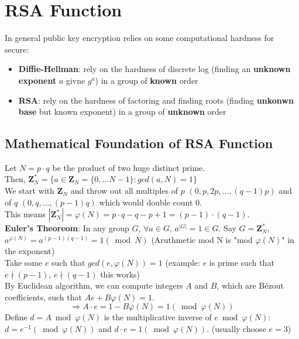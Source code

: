 \documentclass{scribe}
\begin{document}
\maketitle


\section{RSA Function}
In general public key encryption relies on some computational hardness for secure:
\begin{itemize}
    \item \textbf{Diffie-Hellman}: rely on the hardness of discrete log (finding an \textbf{unknown exponent} $a$ givne $g^a$) in a group of \textbf{known} order
    \item \textbf{RSA}: rely on the hardness of factoring and finding roots (finding \textbf{unkonwn base} but known exponent) in a group of \textbf{unknown} order
\end{itemize}

\subsection{Mathematical Foundation of RSA Function}
Let $N = p \cdot q$ be the product of two huge distinct prime.
\\
Then, $\mathbf{Z}_N^* = \{a \in \mathbf{Z}_N = \{0, \dots N-1\}: gcd(a,N) =1\}$
\\
We start with $\mathbf{Z}_N$ and throw out all multiples of $p$ $(0,p,2p, \dots , (q-1)p)$ and of $q$ $(0,q, \dots, (p-1)q)$ which would double count 0. 
\\
This means $|\mathbf{Z}_N^*| = \varphi(N) = p \cdot q - q -p +1 = (p-1)\cdot (q-1)$.
\\
\textbf{Euler's Theoreom}: In any group $G$, $\forall  a \in G$, $a^{|G|} = 1 \in G$. 
Say $G = \mathbf{Z}_N^*$, $a^{\varphi(N)}=a^{(p-1)(q-1)} = 1 (\bmod N)$ 
(Aruthmetic  mod N is "mod $\varphi(N)$" in the exponent)
\\
Take some $e$ such that $gcd(e,\varphi(N)) = 1$ (example: $e$ is prime such that $e \nmid (p-1)$, $e \nmid (q-1)$ this works)
\\
By Euclidean algorithm, we can compute integers $A$ and $B$, which are B\'{e}zout coefficients, such that $Ae+B\varphi(N) = 1$.
\\
\[\Rightarrow A \cdot e = 1 - B \varphi(N) = 1 (\bmod \varphi(N))\]
Define $d = A \bmod \varphi(N)$ is the multiplicative inverse of $e \bmod \varphi(N)$: $d=e^{-1} (\bmod \varphi(N))$ and $d \cdot e = 1 (\bmod \varphi(N))$. (usually choose $e=3$)
\vspace{10mm}
\end{document}
